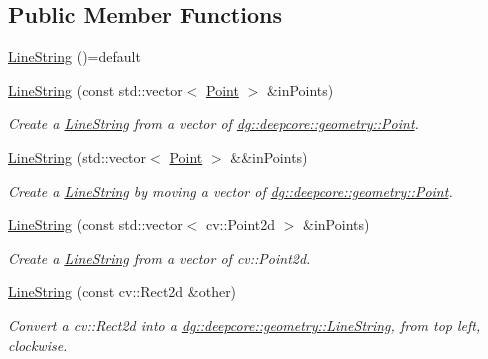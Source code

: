 \subsection*{Public Member Functions}
\begin{DoxyCompactItemize}
\item 
\hyperlink{structdg_1_1deepcore_1_1geometry_1_1_line_string_a7989154aa4b25bcc8126bc08cabe4911}{Line\+String} ()=default
\item 
\hyperlink{structdg_1_1deepcore_1_1geometry_1_1_line_string_a677cef918057627be8192ebf71ba29a9}{Line\+String} (const std\+::vector$<$ \hyperlink{structdg_1_1deepcore_1_1geometry_1_1_point}{Point} $>$ \&in\+Points)
\begin{DoxyCompactList}\small\item\em Create a \hyperlink{structdg_1_1deepcore_1_1geometry_1_1_line_string}{Line\+String} from a vector of \hyperlink{structdg_1_1deepcore_1_1geometry_1_1_point}{dg\+::deepcore\+::geometry\+::\+Point}. \end{DoxyCompactList}\item 
\hyperlink{structdg_1_1deepcore_1_1geometry_1_1_line_string_a576b32ff0b0a21accfad2707f8a5cf7f}{Line\+String} (std\+::vector$<$ \hyperlink{structdg_1_1deepcore_1_1geometry_1_1_point}{Point} $>$ \&\&in\+Points)
\begin{DoxyCompactList}\small\item\em Create a \hyperlink{structdg_1_1deepcore_1_1geometry_1_1_line_string}{Line\+String} by moving a vector of \hyperlink{structdg_1_1deepcore_1_1geometry_1_1_point}{dg\+::deepcore\+::geometry\+::\+Point}. \end{DoxyCompactList}\item 
\hyperlink{structdg_1_1deepcore_1_1geometry_1_1_line_string_ad4ed9be7b4a2fcf4bc292eedb93f8288}{Line\+String} (const std\+::vector$<$ cv\+::\+Point2d $>$ \&in\+Points)
\begin{DoxyCompactList}\small\item\em Create a \hyperlink{structdg_1_1deepcore_1_1geometry_1_1_line_string}{Line\+String} from a vector of cv\+::\+Point2d. \end{DoxyCompactList}\item 
\hyperlink{structdg_1_1deepcore_1_1geometry_1_1_line_string_a8202ea0aaa5412dac44b5c7f4c63af0b}{Line\+String} (const cv\+::\+Rect2d \&other)
\begin{DoxyCompactList}\small\item\em Convert a cv\+::\+Rect2d into a \hyperlink{structdg_1_1deepcore_1_1geometry_1_1_line_string}{dg\+::deepcore\+::geometry\+::\+Line\+String}, from top left, clockwise. \end{DoxyCompactList}\item 

\end{DoxyCompactItemize}
